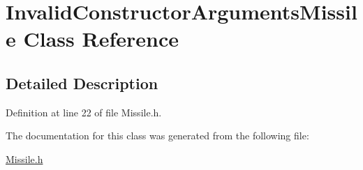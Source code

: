 \hypertarget{class_invalid_constructor_arguments_missile}{\section{Invalid\+Constructor\+Arguments\+Missile Class Reference}
\label{class_invalid_constructor_arguments_missile}
}


\subsection{Detailed Description}


Definition at line 22 of file Missile.\+h.



The documentation for this class was generated from the following file\+:\begin{DoxyCompactItemize}
\item 
\hyperlink{_missile_8h}{Missile.\+h}\end{DoxyCompactItemize}
